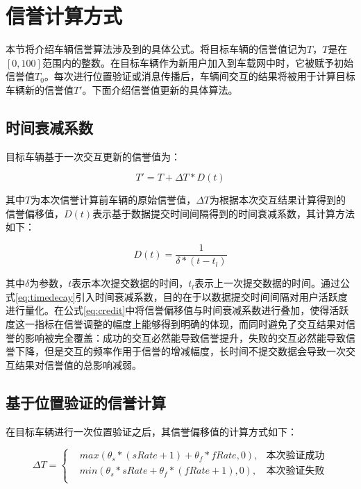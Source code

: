 \section{信誉计算方式}

本节将介绍车辆信誉算法涉及到的具体公式。将目标车辆的信誉值记为$T$，$T$是在$[0,100]$范围内的整数。在目标车辆作为新用户加入到车载网中时，它被赋予初始信誉值$T_0$。每次进行位置验证或消息传播后，车辆间交互的结果将被用于计算目标车辆新的信誉值$T'$。下面介绍信誉值更新的具体算法。

\subsection{时间衰减系数}
目标车辆基于一次交互更新的信誉值为：

\begin{equation}
    T'=T+\Delta T*D(t)
    \label{eq:credit}
\end{equation}

其中$T$为本次信誉计算前车辆的原始信誉值，$\Delta T$为根据本次交互结果计算得到的信誉偏移值，$D(t)$表示基于数据提交时间间隔得到的时间衰减系数，其计算方法如下：

\begin{equation}
    D(t)=\frac{1}{\delta*(t-t_l)}
    \label{eq:timedecay}
\end{equation}

其中$\delta$为参数，$t$表示本次提交数据的时间，$t_l$表示上一次提交数据的时间。通过公式\eqref{eq:timedecay}引入时间衰减系数，目的在于以数据提交时间间隔对用户活跃度进行量化。在公式\eqref{eq:credit}中将信誉偏移值与时间衰减系数进行叠加，使得活跃度这一指标在信誉调整的幅度上能够得到明确的体现，而同时避免了交互结果对信誉的影响被完全覆盖：成功的交互必然能导致信誉提升，失败的交互必然能导致信誉下降，但是交互的频率作用于信誉的增减幅度，长时间不提交数据会导致一次交互结果对信誉值的总影响减弱。

\subsection{基于位置验证的信誉计算}
在目标车辆进行一次位置验证之后，其信誉偏移值的计算方式如下：

\begin{equation}
    \Delta T=\left\{\begin{aligned}
    &max(\theta_{s}*(sRate+1)+\theta_{f}*fRate,0), & \mbox{本次验证成功}\\
    &min(\theta_{s}*sRate+\theta_{f}*(fRate+1),0), & \mbox{本次验证失败}\\
    \end{aligned} \right.
    \label{eq:locproof}
\end{equation}

